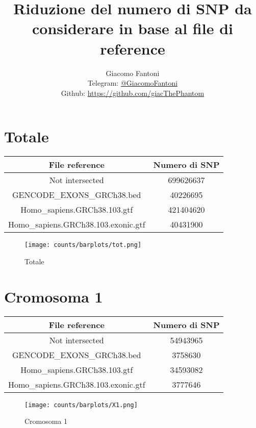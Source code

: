 

\title{Riduzione del numero di SNP da considerare in base al file di reference}

\author{
  Giacomo Fantoni \\
  \small Telegram: \href{https://t.me/GiacomoFantoni}{@GiacomoFantoni} \\[3pt]
\small Github: \href{https://github.com/giacThePhantom}{https://github.com/giacThePhantom}}

\maketitle
\tableofcontents
\section*{Totale}
  \begin{table}[H]\centering
	\begin{tabular}{|c|c|}
	  \hline
	  File reference & Numero di SNP \\
		\hline
		Not intersected & 699626637 \\
	  \hline
	  GENCODE\_EXONS\_GRCh38.bed & 40226695 \\
	  \hline
	  Homo\_sapiens.GRCh38.103.gtf & 421404620     \\
	  \hline
	  Homo\_sapiens.GRCh38.103.exonic.gtf & 40431900  \\
	  \hline
	\end{tabular}
  \end{table}
  \begin{figure}[H]
	\texttt{[image: counts/barplots/tot.png]}
	\caption{Totale}
	\label{fig:tot}
  \end{figure}

\section*{Cromosoma 1}
  \begin{table}[H]\centering
	\begin{tabular}{|c|c|}
	  \hline
	  File reference & Numero di SNP \\
		\hline
		Not intersected & 54943965 \\
	  \hline
	  GENCODE\_EXONS\_GRCh38.bed & 3758630 \\
	  \hline
	  Homo\_sapiens.GRCh38.103.gtf & 34593082 \\
	  \hline
	  Homo\_sapiens.GRCh38.103.exonic.gtf & 3777646 \\
	  \hline
	\end{tabular}
  \end{table}
  \begin{figure}[H]
	\texttt{[image: counts/barplots/X1.png]}
	\caption{Cromosoma 1}
	\label{fig:chr1}
  \end{figure}


